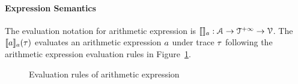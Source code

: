 \paragraph{Expression Semantics}
The evaluation notation for arithmetic expression is $\llbracket  \rrbracket_{a} : \mathcal{A} \to \mathcal{T}^{+\infty} \to \mathcal{V}$.
The $\llbracket a \rrbracket_{a}(\mathtt{\tau})$ evaluates an arithmetic expression $a$ under trace $\mathtt{\tau}$ following the arithmetic expression evaluation rules in Figure~\ref{fig:aexpr-eval}.
\begin{figure}
   \caption{Evaluation rules of arithmetic expression}
   \label{fig:aexpr-eval}
   \end{figure}

